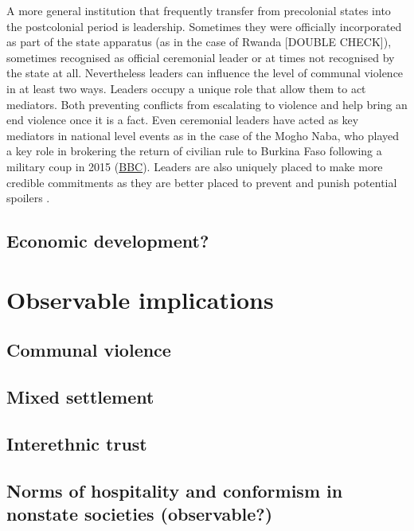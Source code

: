 \documentclass[12pt]{article}
\begin{document}
A more general institution that frequently transfer from precolonial states into
the postcolonial period is leadership. Sometimes they were officially
incorporated as part of the state apparatus (as in the case of Rwanda [DOUBLE
CHECK]), sometimes recognised as official ceremonial leader or at times not
recognised by the state at all. Nevertheless leaders can influence the level of
communal violence in at least two ways. Leaders occupy a unique role that
allow them to act mediators. Both preventing conflicts from escalating to
violence and help bring an end violence once it is a fact. Even ceremonial
leaders have acted as key mediators in national level events as in the case of
the Mogho Naba, who played a key role in brokering the return of civilian rule to
Burkina Faso following a military coup in 2015
(\href{https://www.bbc.com/news/world-africa-34340704}{BBC}). Leaders are also
uniquely placed to make more credible commitments as they are better placed to
prevent and punish potential spoilers \citep{Wig2016}.


\subsection{Economic development?}

\section{Observable implications}


\subsection{Communal violence}

\subsection{Mixed settlement}

\subsection{Interethnic trust}

\subsection{Norms of hospitality and conformism in nonstate societies
(observable?)}
\end{document}
